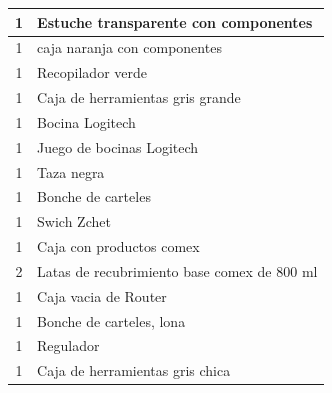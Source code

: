 \documentclass[a4paper,11pt]{article}                 %
\begin{document}
\begin{table}[H]
\begin{tabular}{|c|l|}
    1        & Estuche transparente con componentes               \\ \hline
    1        & caja naranja con componentes                       \\ \hline
    1        & Recopilador verde                                  \\ \hline
    1        & Caja de herramientas gris grande                   \\ \hline
    1        & Bocina Logitech                                    \\ \hline
    1        & Juego de bocinas Logitech                          \\ \hline
    1        & Taza negra                                         \\ \hline
    1        & Bonche de carteles                                 \\ \hline
    1        & Swich Zchet                                        \\ \hline
    1        & Caja con productos comex                           \\ \hline
    2        & Latas de recubrimiento base comex de 800 ml        \\ \hline
    1        & Caja vacia de Router                               \\ \hline
    1        & Bonche de carteles, lona                           \\ \hline
    1        & Regulador                                          \\ \hline
    1        & Caja de herramientas gris chica                    \\ \hline
    \end{tabular}
    \end{table}
\end{document}
